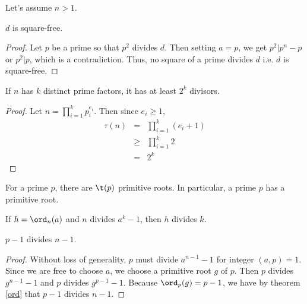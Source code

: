 \documentclass{subfile}
\begin{document}
		\begin{solution}
			Let's assume $n>1$. 
			
			\begin{lemma}
				$d$ is square-free.
			\end{lemma}
			
			\begin{proof}
				Let $p$ be a prime so that $p^2$ divides $d$. Then setting $a=p$, we get $p^2|p^n-p$ or $p^2|p$, which is a contradiction. Thus, no square of a prime divides $d$ i.e. $d$ is square-free.
			\end{proof}
			
			\begin{lemma}
				If $n$ has $k$ distinct prime factors, it has at least $2^k$ divisors.
			\end{lemma}
			
			\begin{proof}
				Let $n=\prod\limits_{i=1}^{k}p_i^{e_i}$. Then since $e_i\geq1$,
				\begin{eqnarray*}
					\tau(n) & = & \prod\limits_{i=1}^{k}(e_i+1)\\
					&\geq& \prod_{i=1}^{k}2\\
					& = & 2^k
				\end{eqnarray*}
			\end{proof}
			
			\begin{theorem}
				For a prime $p$, there are $\t (p)$ primitive roots. In particular, a prime $p$ has a primitive root.
			\end{theorem}
			
			\begin{theorem}\label{ord}
				If $h=\ord_n(a)$ and $n$ divides $a^k-1$, then $h$ divides $k$.
			\end{theorem}
			
			\begin{lemma}
				$p-1$ divides $n-1$.
			\end{lemma}
			
			\begin{proof}
				Without loss of generality, $p$ must divide $a^{n-1}-1$ for integer $(a,p)=1$. Since we are free to choose $a$, we choose a primitive root $g$ of $p$. Then $p$ divides $g^{n-1}-1$ and $p$ divides $g^{p-1}-1$. Because $\ord_p(g)=p-1$, we have by theorem \eqref{ord} that $p-1$ divides $n-1$.
			\end{proof}
			
		\end{solution}
		
\end{document}
